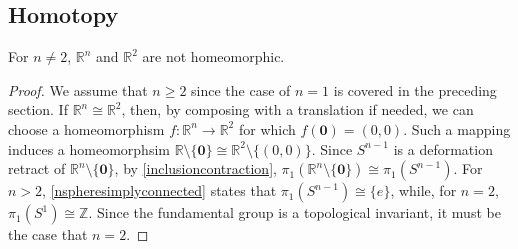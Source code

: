 \subsection{Homotopy}

\begin{theorem}
For $n \neq 2$, $\mathbb{R}^n$ and $\mathbb{R}^2$ are not homeomorphic.
\end{theorem}

\begin{proof}
We assume that $n \geq 2$ since the case of $n = 1$ is covered in the preceding section.
If $\mathbb{R}^n \cong \mathbb{R}^2$, then, by composing with a translation if needed, we can
choose a homeomorphism $f : \mathbb{R}^n \rightarrow \mathbb{R}^2$ for which $f(\textbf{0}) = (0,0)$.
Such a mapping induces a homeomorphsim $\mathbb{R} \setminus \{ \textbf{0} \} \cong \mathbb{R}^2 \setminus \{ (0,0) \}$.
Since $S^{n-1}$ is a deformation retract of $\mathbb{R}^n \setminus \{ \textbf{0} \}$, by \ref{inclusioncontraction},
$\pi_1(\mathbb{R}^n \setminus \{ \textbf{0} \}) \cong \pi_1(S^{n-1})$. For $n > 2$, \ref{nspheresimplyconnected} states
that $\pi_1(S^{n-1}) \cong \{ e \}$, while, for $n = 2$, $\pi_1(S^1) \cong \mathbb{Z}$. Since the fundamental group is a
topological invariant, it must be the case that $n=2$.
\end{proof}